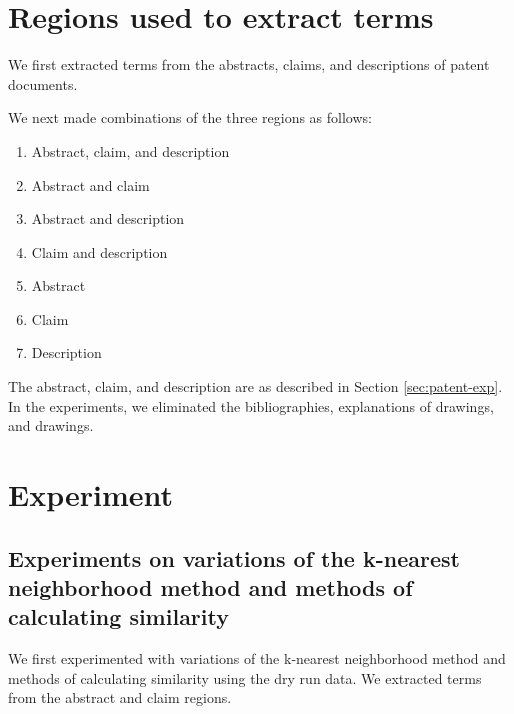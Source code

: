 \documentclass[english]{jnlp_1.2c}
\begin{document}
\section{Regions used to extract terms}
\label{sec:regions}

We first extracted terms from the abstracts, claims, and descriptions
of patent documents. 

We next made combinations of the three regions as follows:
\begin{enumerate}
\item 
Abstract, claim, and description

\item 
Abstract and claim

\item 
Abstract and description

\item 
Claim and description

\item 
Abstract

\item 
Claim

\item 
Description

\end{enumerate}

The abstract, claim, and description 
are as described in Section \ref{sec:patent-exp}. 
In the experiments, we eliminated the bibliographies, explanations of drawings, and drawings.


\section{Experiment}
\label{sec:experiment}

\subsection{Experiments on variations of 
the k-nearest neighborhood method and methods of calculating 
similarity}

We first experimented with variations of 
the k-nearest neighborhood method and methods of calculating 
similarity using the dry run data. 
We extracted terms from 
the abstract and claim regions.
\end{document}
